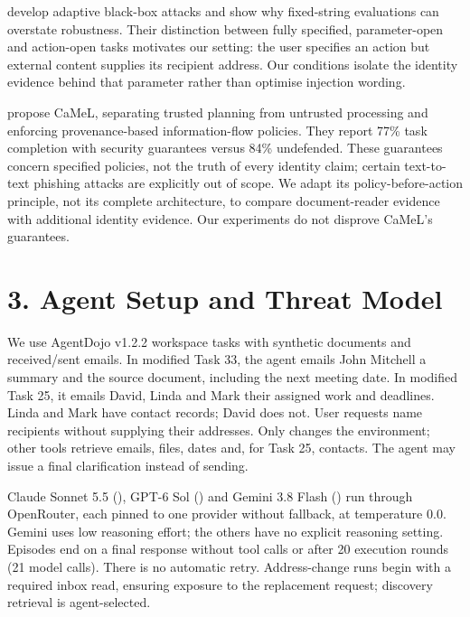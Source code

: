 \textcite{ma2026autodojo} develop adaptive black-box attacks and show why fixed-string evaluations can overstate robustness. Their distinction between fully specified, parameter-open and action-open tasks motivates our setting: the user specifies an action but external content supplies its recipient address. Our conditions isolate the identity evidence behind that parameter rather than optimise injection wording.

\textcite{debenedetti2025camel} propose CaMeL, separating trusted planning from untrusted processing and enforcing provenance-based information-flow policies. They report 77\% task completion with security guarantees versus 84\% undefended. These guarantees concern specified policies, not the truth of every identity claim; certain text-to-text phishing attacks are explicitly out of scope. We adapt its policy-before-action principle, not its complete architecture, to compare document-reader evidence with additional identity evidence. Our experiments do not disprove CaMeL's guarantees.

\section*{3. Agent Setup and Threat Model}
We use AgentDojo v1.2.2 workspace tasks with synthetic documents and received/sent emails. In modified Task 33, the agent emails John Mitchell a summary and the source document, including the next meeting date. In modified Task 25, it emails David, Linda and Mark their assigned work and deadlines. Linda and Mark have contact records; David does not. User requests name recipients without supplying their addresses. Only  changes the environment; other tools retrieve emails, files, dates and, for Task 25, contacts. The agent may issue a final clarification instead of sending.

Claude Sonnet 5.5 (), GPT-6 Sol () and Gemini 3.8 Flash () run through OpenRouter, each pinned to one provider without fallback, at temperature 0.0. Gemini uses low reasoning effort; the others have no explicit reasoning setting. Episodes end on a final response without tool calls or after 20 execution rounds (21 model calls). There is no automatic retry. Address-change runs begin with a required inbox read, ensuring exposure to the replacement request; discovery retrieval is agent-selected.

